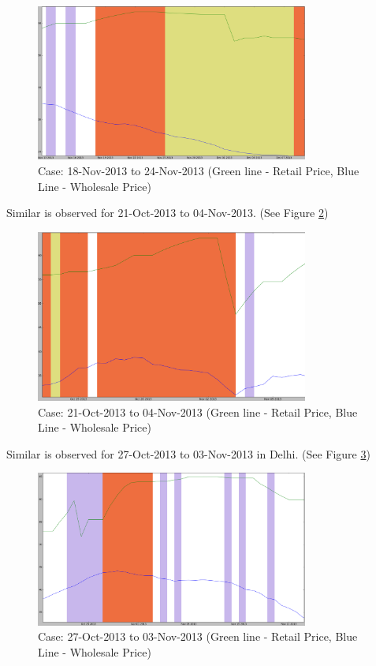 \begin{itemize}
	\begin{figure}[H]
	\centering
	\includegraphics[width=0.8\textwidth]{graphs/Mumbai_RetailvsWS_ill1.png}
	\caption{Case: 18-Nov-2013 to 24-Nov-2013 (Green line - Retail Price, Blue Line - Wholesale Price)}
	\label{fig:Mumbai_RetailvsWS_ill1}
	\end{figure}	
Similar is observed for 21-Oct-2013 to 04-Nov-2013. (See Figure \ref{fig:Mumbai_RetailvsWS_ill2})

	\begin{figure}[H]
	\centering
	\includegraphics[width=0.8\textwidth]{graphs/Mumbai_RetailvsWS_ill2.png}
	\caption{Case: 21-Oct-2013 to 04-Nov-2013 (Green line - Retail Price, Blue Line - Wholesale Price)}
	\label{fig:Mumbai_RetailvsWS_ill2}
	\end{figure}

Similar is observed for 27-Oct-2013 to 03-Nov-2013 in Delhi. (See Figure \ref{fig:Delhi_RetailvsWS_ill1})

	\begin{figure}[H]
	\centering
	\includegraphics[width=0.8\textwidth]{graphs/Delhi_RetailvsWS_ill1.png}
	\caption{Case: 27-Oct-2013 to 03-Nov-2013 (Green line - Retail Price, Blue Line - Wholesale Price)}
	\label{fig:Delhi_RetailvsWS_ill1}
	\end{figure}


\end{itemize}
